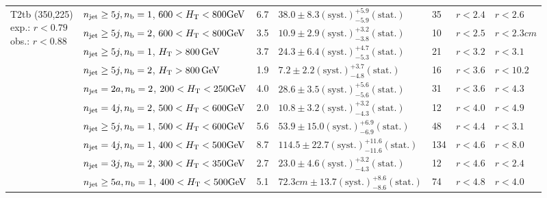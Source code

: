 \begin{table}[h!]
\begin{tabular}{ lllllll }
\multirow{10}{*}{\parbox[t]{2.3cm}{T2tb (350,225)\\exp.: $r<0.79$\\obs.: $r<0.88$}}
 & $n_{\mathrm{jet}} \geq5j,n_{\text{b}} =1$, $600 < \mbox{$H_\text{T}$} < 800 \mathrm{GeV}$ & 6.7 & $38.0 \pm 8.3 \mathrm{(syst.)} ^{+5.9}_{-5.9} \mathrm{(stat.)}$ & 35 & $r < 2.4$ & $r < 2.6$\\ 
 & $n_{\mathrm{jet}} \geq5j,n_{\text{b}} =2$, $600 < \mbox{$H_\text{T}$} < 800 \mathrm{GeV}$ & 3.5 & $10.9 \pm 2.9 \mathrm{(syst.)} ^{+3.2}_{-3.8} \mathrm{(stat.)}$ & 10 & $r < 2.5$ & $r < 2.3cm$\\ 
 & $n_{\mathrm{jet}} \geq5j,n_{\text{b}} =1$, $\mbox{$H_\text{T}$} > 800 \, \mathrm{GeV}$ & 3.7 & $24.3 \pm 6.4 \mathrm{(syst.)} ^{+4.7}_{-5.3} \mathrm{(stat.)}$ & 21 & $r < 3.2$ & $r < 3.1$\\ 
 & $n_{\mathrm{jet}} \geq5j,n_{\text{b}} =2$, $\mbox{$H_\text{T}$} > 800 \, \mathrm{GeV}$ & 1.9 & $7.2 \pm 2.2 \mathrm{(syst.)} ^{+3.7}_{-4.8} \mathrm{(stat.)}$ & 16 & $r < 3.6$ & $r < 10.2$\\ 
 & $n_{\mathrm{jet}} =2a,n_{\text{b}} =2$, $200 < \mbox{$H_\text{T}$} < 250 \mathrm{GeV}$ & 4.0 & $28.6 \pm 3.5 \mathrm{(syst.)} ^{+5.6}_{-5.6} \mathrm{(stat.)}$ & 31 & $r < 3.6$ & $r < 4.3$\\ 
 & $n_{\mathrm{jet}} =4j,n_{\text{b}} =2$, $500 < \mbox{$H_\text{T}$} < 600 \mathrm{GeV}$ & 2.0 & $10.8 \pm 3.2 \mathrm{(syst.)} ^{+3.2}_{-4.3} \mathrm{(stat.)}$ & 12 & $r < 4.0$ & $r < 4.9$\\ 
 & $n_{\mathrm{jet}} \geq5j,n_{\text{b}} =1$, $500 < \mbox{$H_\text{T}$} < 600 \mathrm{GeV}$ & 5.6 & $53.9 \pm 15.0 \mathrm{(syst.)} ^{+6.9}_{-6.9} \mathrm{(stat.)}$ & 48 & $r < 4.4$ & $r < 3.1$\\ 
 & $n_{\mathrm{jet}} =4j,n_{\text{b}} =1$, $400 < \mbox{$H_\text{T}$} < 500 \mathrm{GeV}$ & 8.7 & $114.5 \pm 22.7 \mathrm{(syst.)} ^{+11.6}_{-11.6} \mathrm{(stat.)}$ & 134 & $r < 4.6$ & $r < 8.0$\\ 
 & $n_{\mathrm{jet}} =3j,n_{\text{b}} =2$, $300 < \mbox{$H_\text{T}$} < 350 \mathrm{GeV}$ & 2.7 & $23.0 \pm 4.6 \mathrm{(syst.)} ^{+3.2}_{-4.3} \mathrm{(stat.)}$ & 12 & $r < 4.6$ & $r < 2.4$\\ 
 & $n_{\mathrm{jet}} \geq5a,n_{\text{b}} =1$, $400 < \mbox{$H_\text{T}$} < 500 \mathrm{GeV}$ & 5.1 & $72.3cm \pm 13.7 \mathrm{(syst.)} ^{+8.6}_{-8.6} \mathrm{(stat.)}$ & 74 & $r < 4.8$ & $r < 4.0$\\ \hline
    \hline
  \end{tabular}
\end{table}

